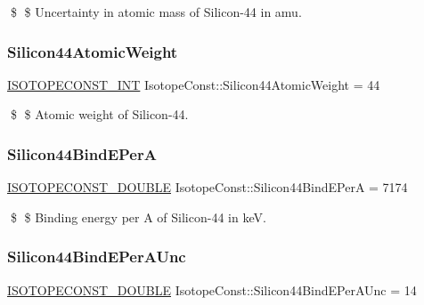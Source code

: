 \$ \$ Uncertainty in atomic mass of Silicon-\/44 in amu. \mbox{\label{group___isotope_const-_silicon-_si44_ga76da45a3499d5d832b8c6608760bc37d}} 
\subsubsection{\texorpdfstring{Silicon44\+Atomic\+Weight}{Silicon44AtomicWeight}}
{\footnotesize\ttfamily \mbox{\hyperlink{group___isotope_const-_macros_ga5f18360b3e99483a35c32d789e62621c}{I\+S\+O\+T\+O\+P\+E\+C\+O\+N\+S\+T\+\_\+\+I\+NT}} Isotope\+Const\+::\+Silicon44\+Atomic\+Weight = 44}

\$ \$ Atomic weight of Silicon-\/44. \mbox{\label{group___isotope_const-_silicon-_si44_ga1bdbbeedc56ed9521a2d184486b45b15}} 
\subsubsection{\texorpdfstring{Silicon44\+Bind\+E\+PerA}{Silicon44BindEPerA}}
{\footnotesize\ttfamily \mbox{\hyperlink{group___isotope_const-_macros_ga8f45a7272ce02c0b4c65c44636ed719a}{I\+S\+O\+T\+O\+P\+E\+C\+O\+N\+S\+T\+\_\+\+D\+O\+U\+B\+LE}} Isotope\+Const\+::\+Silicon44\+Bind\+E\+PerA = 7174}

\$ \$ Binding energy per A of Silicon-\/44 in keV. \mbox{\label{group___isotope_const-_silicon-_si44_ga64449c9fa6ed7017abe6c0e8a7c1214d}} 
\subsubsection{\texorpdfstring{Silicon44\+Bind\+E\+Per\+A\+Unc}{Silicon44BindEPerAUnc}}
{\footnotesize\ttfamily \mbox{\hyperlink{group___isotope_const-_macros_ga8f45a7272ce02c0b4c65c44636ed719a}{I\+S\+O\+T\+O\+P\+E\+C\+O\+N\+S\+T\+\_\+\+D\+O\+U\+B\+LE}} Isotope\+Const\+::\+Silicon44\+Bind\+E\+Per\+A\+Unc = 14}

